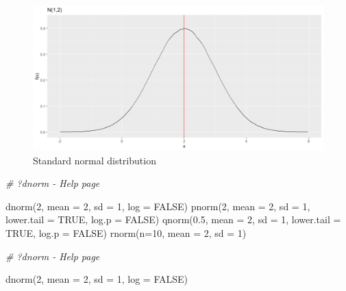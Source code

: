 \documentclass[
]{book}
\newenvironment{Shaded}{\begin{snugshade}}{\end{snugshade}}
\newcommand{\AttributeTok}[1]{\textcolor[rgb]{0.77,0.63,0.00}{#1}}
\newcommand{\CommentTok}[1]{\textcolor[rgb]{0.56,0.35,0.01}{\textit{#1}}}
\newcommand{\ConstantTok}[1]{\textcolor[rgb]{0.00,0.00,0.00}{#1}}
\newcommand{\DecValTok}[1]{\textcolor[rgb]{0.00,0.00,0.81}{#1}}
\newcommand{\FloatTok}[1]{\textcolor[rgb]{0.00,0.00,0.81}{#1}}
\newcommand{\FunctionTok}[1]{\textcolor[rgb]{0.00,0.00,0.00}{#1}}
\newcommand{\NormalTok}[1]{#1}
\begin{document}
\begin{figure}

{\centering \includegraphics{figure/norm6-1} 

}

\caption{Standard normal distribution}\label{fig:norm6}
\end{figure}

\begin{Shaded}
\begin{Highlighting}[]
\CommentTok{\# ?dnorm {-} Help page}

\FunctionTok{dnorm}\NormalTok{(}\DecValTok{2}\NormalTok{, }\AttributeTok{mean =} \DecValTok{2}\NormalTok{, }\AttributeTok{sd =} \DecValTok{1}\NormalTok{, }\AttributeTok{log =} \ConstantTok{FALSE}\NormalTok{)}
\FunctionTok{pnorm}\NormalTok{(}\DecValTok{2}\NormalTok{, }\AttributeTok{mean =} \DecValTok{2}\NormalTok{, }\AttributeTok{sd =} \DecValTok{1}\NormalTok{, }\AttributeTok{lower.tail =} \ConstantTok{TRUE}\NormalTok{, }\AttributeTok{log.p =} \ConstantTok{FALSE}\NormalTok{)}
\FunctionTok{qnorm}\NormalTok{(}\FloatTok{0.5}\NormalTok{, }\AttributeTok{mean =} \DecValTok{2}\NormalTok{, }\AttributeTok{sd =} \DecValTok{1}\NormalTok{, }\AttributeTok{lower.tail =} \ConstantTok{TRUE}\NormalTok{, }\AttributeTok{log.p =} \ConstantTok{FALSE}\NormalTok{)}
\FunctionTok{rnorm}\NormalTok{(}\AttributeTok{n=}\DecValTok{10}\NormalTok{, }\AttributeTok{mean =} \DecValTok{2}\NormalTok{, }\AttributeTok{sd =} \DecValTok{1}\NormalTok{)}
\end{Highlighting}
\end{Shaded}

\begin{Shaded}
\begin{Highlighting}[]
\CommentTok{\# ?dnorm {-} Help page}

\FunctionTok{dnorm}\NormalTok{(}\DecValTok{2}\NormalTok{, }\AttributeTok{mean =} \DecValTok{2}\NormalTok{, }\AttributeTok{sd =} \DecValTok{1}\NormalTok{, }\AttributeTok{log =} \ConstantTok{FALSE}\NormalTok{)}
\end{Highlighting}
\end{Shaded}
\end{document}
